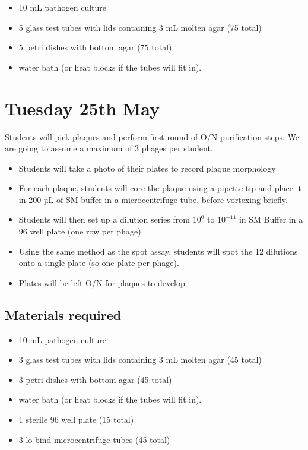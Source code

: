 \documentclass[
]{book}
\providecommand{\tightlist}{%
  \setlength{\itemsep}{0pt}\setlength{\parskip}{0pt}}
\begin{document}
\begin{itemize}
\tightlist
\item
  10 mL pathogen culture
\item
  5 glass test tubes with lids containing 3 mL molten agar (75 total)
\item
  5 petri dishes with bottom agar (75 total)
\item
  water bath (or heat blocks if the tubes will fit in).
\end{itemize}

\hypertarget{tuesday-25th-may}{%
\section{Tuesday 25th May}\label{tuesday-25th-may}}

Students will pick plaques and perform first round of O/N purification steps. We are going to assume a maximum of 3 phages per student.

\begin{itemize}
\tightlist
\item
  Students will take a photo of their plates to record plaque morphology
\item
  For each plaque, students will core the plaque using a pipette tip and place it in 200 µL of SM buffer in a microcentrifuge tube, before vortexing briefly.
\item
  Students will then set up a dilution series from \(10^{0}\) to \(10^{-11}\) in SM Buffer in a 96 well plate (one row per phage)
\item
  Using the same method as the spot assay, students will spot the 12 dilutions onto a single plate (so one plate per phage).
\item
  Plates will be left O/N for plaques to develop
\end{itemize}

\hypertarget{materials-required-6}{%
\subsection{Materials required}\label{materials-required-6}}

\begin{itemize}
\tightlist
\item
  10 mL pathogen culture
\item
  3 glass test tubes with lids containing 3 mL molten agar (45 total)
\item
  3 petri dishes with bottom agar (45 total)
\item
  water bath (or heat blocks if the tubes will fit in).
\item
  1 sterile 96 well plate (15 total)
\item
  3 lo-bind microcentrifuge tubes (45 total)
\end{itemize}
\end{document}
